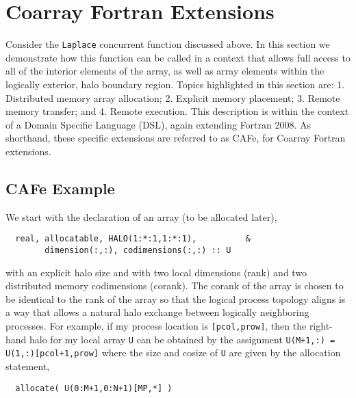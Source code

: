 \section{Coarray Fortran Extensions}


Consider the \texttt{Laplace} concurrent function discussed above.  In this section we demonstrate
how this function can be called in a context that allows full access to all of the interior elements
of the array, as well as array elements within the logically exterior, halo boundary region.  Topics
highlighted in this section are:
1. Distributed memory array allocation;
2. Explicit memory placement;
3. Remote memory transfer; and
4. Remote execution.
This description is within the context of a Domain Specific Language (DSL), again extending Fortran
2008.  As shorthand, these specific extensions are referred to as CAFe, for Coarray Fortran extensions.

\subsection{CAFe Example}

We start with the declaration of an array (to be allocated later),
\begin{verbatim}
  real, allocatable, HALO(1:*:1,1:*:1),          &
        dimension(:,:), codimensions(:,:) :: U
\end{verbatim}
with an explicit halo size and with two local dimensions (rank) and two distributed memory
codimensions (corank).  The corank of the array is chosen to be identical to the rank of
the array so that the logical process topology aligns is a way that allows a natural
halo exchange between logically neighboring processes.  For example, if my process
location is \texttt{[pcol,prow]}, then the right-hand halo for my local array \texttt{U}
can be obtained by the assignment \texttt{U(M+1,:) = U(1,:)[pcol+1,prow]} where the size
and cosize of \texttt{U} are given by the allocation statement,
\begin{verbatim}
  allocate( U(0:M+1,0:N+1)[MP,*] )
\end{verbatim}

